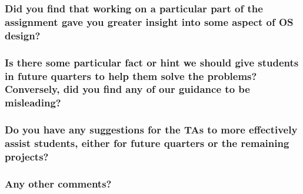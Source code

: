 \documentclass[sigconf, nonacm]{acmart}
\begin{document}
        \subsubsection*{Did you find that working on a particular part of the assignment gave you greater insight into some aspect of OS design? }

        \subsubsection*{Is there some particular fact or hint we should give students in future quarters to help them solve the problems? Conversely, did you find any of our guidance to be misleading? }

        \subsubsection*{Do you have any suggestions for the TAs to more effectively assist students, either for future quarters or the remaining projects? }

        \subsubsection*{Any other comments? }
\end{document}
